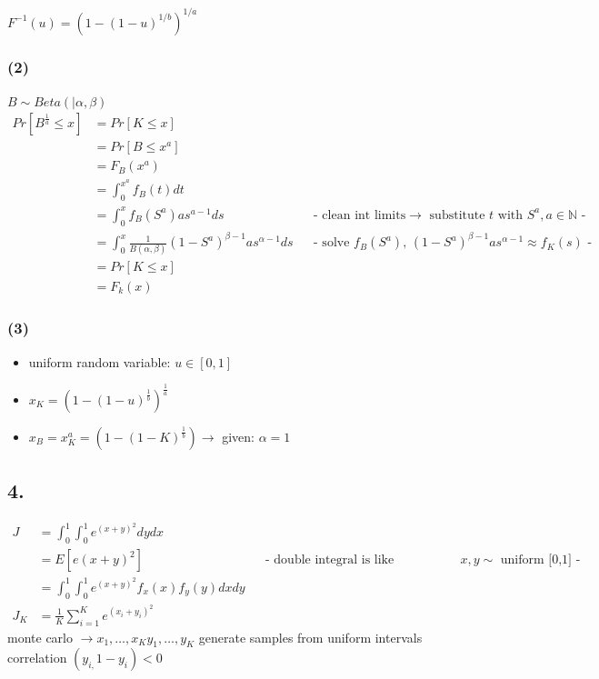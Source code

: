 $F^{-1}(u) = (1-(1-u)^{1/b})^{1/a}$

\subsubsection*{ (2) }

$B\sim Beta\left(|\alpha ,\beta \right)$
\begin{align*}
Pr\left[B^{{\frac{1}{a}}}\le x\right]&=Pr\left[K\le x\right]\\
&=Pr\left[B\le x^{a}\right]\\
&=F_{B}\left(x^{a}\right)\\
&=\int _{0}^{{x^{a}}}f_{B}\left(t\right)dt\\
&=\int _{0}^{x}f_{B}\left(S^{a}\right)as^{{a-1}}ds&& \text{- clean int limits$\rightarrow$  substitute $t$ with $S^{a},a\in \mathbb{N}$ -}\\
&=\int _{0}^{x}\frac{1}{B\left(\alpha ,\beta \right)}\left(1-S^{a}\right)^{{\beta -1}}as^{{\alpha -1}}ds&& \text{-  solve $f_B(S^a)$, $\left(1-S^{a}\right)^{{\beta -1}}as^{{\alpha -1}}\approx f_{K}\left(s\right)$ -}\\
&=Pr\left[K\le x\right]\\
&=F_{k}\left(x\right)
\end{align*}

\subsubsection*{ (3) }

\begin{itemize}
\item  uniform random variable: $u\in \left[0,1\right]$
\item  $x_{K}=\left(1-\left(1-u\right)^{{\frac{1}{b}}}\right)^{{\frac{1}{a}}}$
\item $x_{B}=x^{a}_{K}=\left(1-\left(1-K\right)^{{\frac{1}{b}}}\right) \rightarrow $ given: $\alpha = 1$
\end{itemize}

\subsection*{ 4. }

\begin{align*}
J&=\int _{0}^{1}\int _{0}^{1}e^{\left(x+y\right)^{2}}dydx\\
&=E\left[e\left(x+y\right)^{2}\right]&& \text{-  double integral is like expectation, $x,y\sim $ uniform [0,1] -}\\
&=\int _{0}^{1}\int _{0}^{1}e^{\left(x+y\right)^{2}}f_{x}\left(x\right)f_{y}\left(y\right)dxdy\\
J_{K}&=\frac{1}{K}\sum _{{i=1}}^{K}e^{\left(x_{i}+y_{i}\right)^{2}}
\end{align*}
monte carlo $\rightarrow x_{1},\ldots ,x_{K}y_{1},\ldots ,y_{K}$ generate samples from uniform intervals 
correlation $\left(y_{i,}1-y_{i}\right)< 0$

